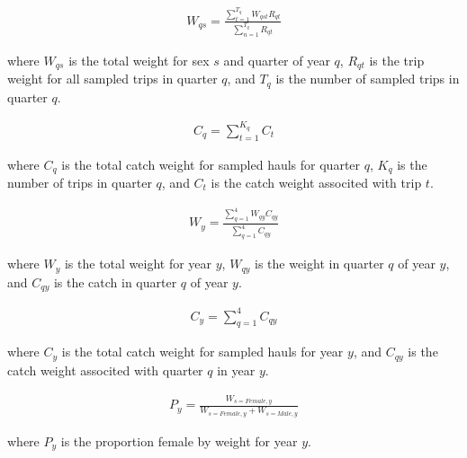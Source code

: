 \documentclass[11pt]{book}\usepackage[]{graphicx}\usepackage[]{color}
\begin{document}
\begin{align} \label{eq:totalquarterwt}
W_{qs}=\frac{\sum\limits_{t=1}^{T_q}W_{qst}R_{qt}}{\sum\limits_{n=1}^{T_q}R_{qt}}
\end{align}
\begin{addmargin}[3em]{1em}
where $W_{qs}$ is the total weight for sex $s$ and quarter of year $q$, $R_{qt}$ is the trip weight for all sampled trips in quarter $q$,
and $T_q$ is the number of sampled trips in quarter $q$.
\end{addmargin}

\begin{align} \label{eq:totalquartercatchwt}
C_q=\sum\limits_{t=1}^{K_q}C_{t}
\end{align}
\begin{addmargin}[3em]{1em}
where $C_q$ is the total catch weight for sampled hauls for quarter $q$, $K_q$ is the number of trips in quarter $q$, and $C_t$ is the catch weight associted with trip $t$.
\end{addmargin}

\begin{align} \label{eq:totalyearwt}
W_y=\frac{\sum\limits_{q=1}^{4}W_{qy}C_{qy}}{\sum\limits_{q=1}^{4}C_{qy}}
\end{align}
\begin{addmargin}[3em]{1em}
where $W_y$ is the total weight for year $y$, $W_{qy}$ is the weight in quarter $q$ of year $y$, and $C_{qy}$ is the catch in quarter $q$ of year $y$.
\end{addmargin}

\begin{align} \label{eq:totalyearcatchwt}
C_y=\sum\limits_{q=1}^{4}C_{qy}
\end{align}
\begin{addmargin}[3em]{1em}
where $C_y$ is the total catch weight for sampled hauls for year $y$, and $C_{qy}$ is the catch weight associted with quarter $q$ in year $y$.
\end{addmargin}

\begin{align} \label{eq:propfemale}
P_y=\frac{W_{s=Female,y}}{W_{s=Female,y}+W_{s=Male,y}}
\end{align}
\begin{addmargin}[3em]{1em}
where $P_y$ is the proportion female by weight for year $y$.
\end{addmargin}
\end{document}
